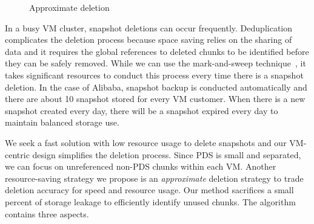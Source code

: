 \begin{figure}[htbp]
  \centering
  \caption{Approximate deletion}
  \label{fig:deletion_flow}
\end{figure}

In a busy VM cluster, snapshot deletions can occur frequently.
Deduplication complicates the deletion process because space saving relies on the sharing of data
and it requires the global references to deleted chunks to be identified before  they can be safely removed.
While we can use the mark-and-sweep technique~\cite{Guo2011}, 
it takes significant resources to conduct this process every time there is a snapshot deletion.
In the case of Alibaba, snapshot backup is conducted automatically and there are 
about 10 snapshot stored for every VM customer. When there is
a new snapshot created every day,  there will be a snapshot expired every day to maintain
balanced storage use. 

We seek a fast solution with low resource usage to delete snapshots and
our VM-centric design simplifies the deletion process. 
Since PDS is small and separated, we can focus on  unreferenced non-PDS chunks within each VM. 
Another resource-saving strategy we propose is
an {\em approximate} deletion strategy to trade deletion accuracy for
speed and resource usage. Our method sacrifices a small percent of storage leakage
to efficiently identify unused chunks.
The algorithm contains three aspects.

